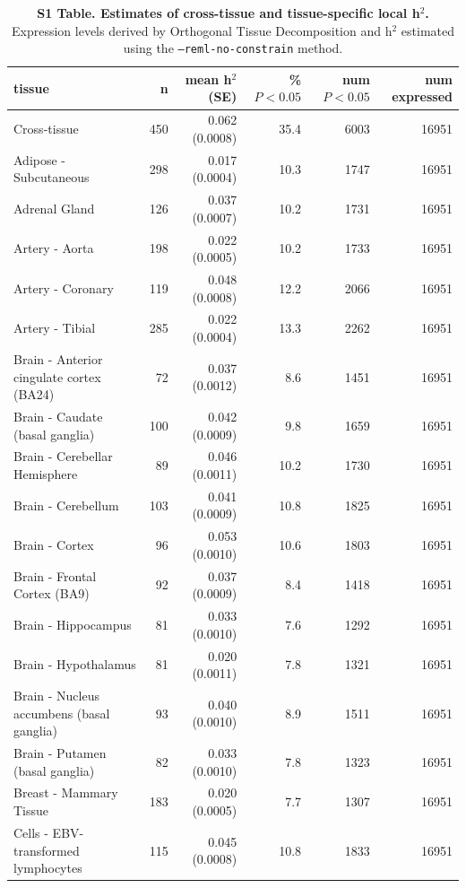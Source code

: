 \documentclass[10pt,letterpaper]{article}
\begin{document}
\begin{table}[!ht]
\begin{adjustwidth}{-2.25in}{0in} %
\caption*{{\bf S1 Table. Estimates of cross-tissue and tissue-specific local h$^2$.} Expression levels derived by Orthogonal Tissue Decomposition and h$^2$ estimated using the \texttt{--reml-no-constrain} method.}
\centering
\begin{tabular}{lrrrrr}
  \hline
tissue & n & mean h$^2$ (SE) & \% $P<0.05$ & num $P<0.05$ & num expressed \\ 
  \hline
Cross-tissue & 450 & 0.062 (0.0008) & 35.4 & 6003 & 16951 \\ 
  Adipose - Subcutaneous & 298 & 0.017 (0.0004) & 10.3 & 1747 & 16951 \\ 
  Adrenal Gland & 126 & 0.037 (0.0007) & 10.2 & 1731 & 16951 \\ 
  Artery - Aorta & 198 & 0.022 (0.0005) & 10.2 & 1733 & 16951 \\ 
  Artery - Coronary & 119 & 0.048 (0.0008) & 12.2 & 2066 & 16951 \\ 
  Artery - Tibial & 285 & 0.022 (0.0004) & 13.3 & 2262 & 16951 \\ 
  Brain - Anterior cingulate cortex (BA24) & 72 & 0.037 (0.0012) & 8.6 & 1451 & 16951 \\ 
  Brain - Caudate (basal ganglia) & 100 & 0.042 (0.0009) & 9.8 & 1659 & 16951 \\ 
  Brain - Cerebellar Hemisphere & 89 & 0.046 (0.0011) & 10.2 & 1730 & 16951 \\ 
  Brain - Cerebellum & 103 & 0.041 (0.0009) & 10.8 & 1825 & 16951 \\ 
  Brain - Cortex & 96 & 0.053 (0.0010) & 10.6 & 1803 & 16951 \\ 
  Brain - Frontal Cortex (BA9) & 92 & 0.037 (0.0009) & 8.4 & 1418 & 16951 \\ 
  Brain - Hippocampus & 81 & 0.033 (0.0010) & 7.6 & 1292 & 16951 \\ 
  Brain - Hypothalamus & 81 & 0.020 (0.0011) & 7.8 & 1321 & 16951 \\ 
  Brain - Nucleus accumbens (basal ganglia) & 93 & 0.040 (0.0010) & 8.9 & 1511 & 16951 \\ 
  Brain - Putamen (basal ganglia) & 82 & 0.033 (0.0010) & 7.8 & 1323 & 16951 \\ 
  Breast - Mammary Tissue & 183 & 0.020 (0.0005) & 7.7 & 1307 & 16951 \\ 
  Cells - EBV-transformed lymphocytes & 115 & 0.045 (0.0008) & 10.8 & 1833 & 16951 \\ 

\end{tabular}
\end{adjustwidth}
\end{table}
\end{document}
